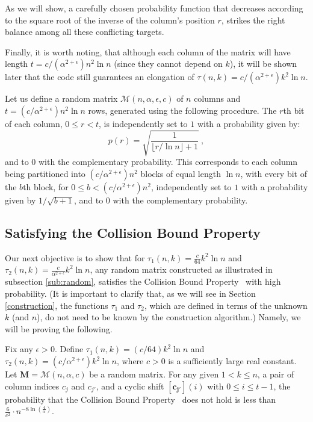 \documentclass[11pt]{article}
\begin{document}
As we will show, a carefully chosen probability function
that decreases according to the square root of the inverse of the column's position $r$,
strikes the right balance among all these conflicting targets.

Finally, it is worth noting, that although each column of the matrix will have length 
$t = c/(\alpha^{2+\epsilon}) n^2 \ln n$ 
(since they cannot depend on $k$), 
it will be shown 
later
that 
the code still guarantees an elongation of 
$\tau(n,k) = c/(\alpha^{2 + \epsilon}) k^2 \ln n$.

\begin{definition}\label{randomatrix} 
Let us define a random matrix ${\mathcal{M}}(n, \alpha, \epsilon, c)$ of $n$ columns and 
$t = (c/\alpha^{2 + \epsilon}) n^2\ln n$ rows, generated using the following procedure. 
	The $r$th bit of each column, $0\le r < t$, is independently set to $1$ with a probability given by:
	\[
	p(r) = \sqrt{\frac{1}{\lfloor r/\ln n \rfloor +1}}
 \ , 
	\]
	and to $0$ with the complementary probability.
This corresponds to each column being partitioned into $(c/\alpha^{2+\epsilon}) n^2$ blocks 
	of equal length $\ln n$, with every bit of the $b$th block, 
 for $0 \le b < (c/\alpha^{2 + \epsilon}) n^2$, independently set to $1$
 with a probability given by $1/\sqrt{b + 1}$,
	and to $0$ with the complementary probability.	
\end{definition}



\subsection{Satisfying the Collision Bound Property}\label{satisfaction}

Our next objective is to show that for $\tau_1(n,k) = \frac{c}{64 } k^2 \ln n$ and 
$\tau_2(n,k) = \frac{c}{\alpha^{2 + \epsilon}} k^2 \ln n$, any random matrix constructed as
illustrated in subsection \ref{sub:random}, satisfies the Collision Bound Property
\pairCondition\
with high probability.
(It is important to clarify that, as we will see in Section \ref{construction}, the functions 
$\tau_1$ and $\tau_2$, which are defined in terms of the unknown $k$ (and $n$), do not need 
to be known by the construction algorithm.)
Namely, we will be proving the following.
\begin{lemma}
\label{lep} 
Fix any $\epsilon > 0$. Define $\tau_1(n,k) = (c /64 ) k^2 \ln n$ and 
$\tau_2(n,k) = (c/\alpha^{2+\epsilon} ) k^2 \ln n$, where 
$c > 0$ is a sufficiently large real constant. Let 
$\mathbf{M} = \mathcal{M}(n, \alpha, c)$ be a random matrix. 
For any given $1 < k \leq n$, a pair of column indices $c_j$ and $c_{j'}$, 
and a cyclic shift $\mathbf{[c_{j'}]}(i)$ with $0 \leq i \leq t-1$, 
 the probability that the Collision Bound Property \pairCondition\ does not hold is less than
$  \frac{6}{c^2}\cdot  n^{-8\ln\left(\frac{4}{\alpha}\right)}$. 
\end{lemma}
\end{document}

